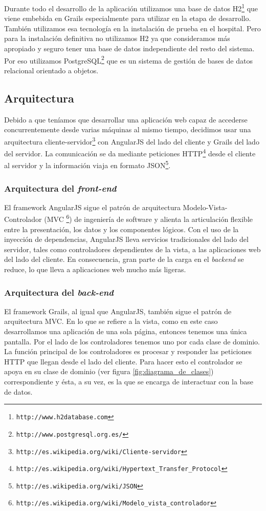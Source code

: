 Durante todo el desarrollo de la aplicación utilizamos una base de datos H2\footnote{\texttt{http://www.h2database.com}} que viene embebida en Grails especialmente para utilizar en la etapa de desarrollo. También utilizamos esa tecnología en la instalación de prueba en el hospital. Pero para la instalación definitiva no utilizamos H2 ya que consideramos más apropiado y seguro tener una base de datos independiente del resto del sistema. Por eso utilizamos PostgreSQL\footnote{\texttt{http://www.postgresql.org.es/}} que es un sistema de gestión de bases de datos relacional orientado a objetos.


\subsection{Arquitectura}
Debido a que teníamos que desarrollar una aplicación web capaz de accederse concurrentemente desde varias máquinas al mismo tiempo, decidimos usar una arquitectura cliente-servidor\footnote{\texttt{http://es.wikipedia.org/wiki/Cliente-servidor}} con AngularJS del lado del cliente y Grails del lado del servidor. La comunicación se da mediante peticiones HTTP\footnote{\texttt{http://es.wikipedia.org/wiki/Hypertext\_Transfer\_Protocol}} desde el cliente al servidor y la información viaja en formato JSON\footnote{\texttt{http://es.wikipedia.org/wiki/JSON}}.


\subsubsection{Arquitectura del \textit{front-end}}
El framework AngularJS sigue el patrón de arquitectura Modelo-Vista-Controlador (MVC  \footnote{\texttt{http://es.wikipedia.org/wiki/Modelo\_vista\_controlador}}) de ingeniería de software y alienta la articulación flexible entre la presentación, los datos y los componentes lógicos. Con el uso de la inyección de dependencias, AngularJS lleva servicios tradicionales del lado del servidor, tales como controladores dependientes de la vista, a las aplicaciones web del lado del cliente. En consecuencia, gran parte de la carga en el \textit{backend} se reduce, lo que lleva a aplicaciones web mucho más ligeras.

\subsubsection{Arquitectura del \textit{back-end}}
El framework Grails, al igual que AngularJS, también sigue el patrón de arquitectura MVC. En lo que se refiere a la vista, como en este caso desarrollamos una aplicación de una sola página, entonces tenemos una única pantalla. Por el lado de los controladores tenemos uno por cada clase de dominio. La función principal de los controladores es procesar y responder las peticiones HTTP que llegan desde el lado del cliente. Para hacer esto el controlador se apoya en su clase de dominio (ver figura \ref{fig:diagrama_de_clases}) correspondiente y ésta, a su vez, es la que se encarga de interactuar con la base de datos.

